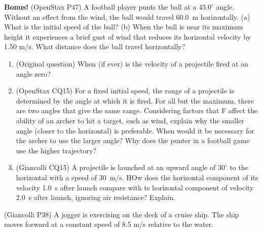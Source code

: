 \documentclass[10pt,twocolumn]{exam}
\def\myquestion{\question\stepcounter{footnote}}
\begin{document}
\begin{questions}
\myquestion \textbf{Bonus!} (OpenStax P47)
A football player punts the ball at a $45.0^\circ$ angle. Without an effect from the wind, the ball would travel 60.0~m horizontally. (a) What is the initial speed of the ball? (b) When the ball is near its maximum height it experiences a brief gust of wind that reduces its horizontal velocity by 1.50 m/s. What distance does the ball travel horizontally?


\begin{enumerate}[resume*]
  \item (Original question) When (if ever) is the velocity of a projectile fired at an angle zero?
  \item (OpenStax CQ15) For a fixed initial speed, the range of a projectile is determined by the angle at which it is fired. For all but the maximum, there are two angles that give the same range. Considering factors that F affect the ability of an archer to hit a target, such as wind, explain why the smaller angle (closer to the horizontal) is preferable. When would it be necessary for the archer to use the larger angle? Why does the punter in a football game use the higher trajectory?
  \item (Giancolli CQ15) A projectile is launched at an upward angle of $30^\circ$ to the horizontal with a speed of 30~m/s.  HOw does the horizontal component of its velocity 1.0~s after launch compare with ts horizontal component of velocity 2.0~s after launch, ignoring air resistance?  Explain.
\end{enumerate}




\myquestion (Giancolli P38) 
A jogger is exercising on the deck of a cruise ship. The ship moves forward at a constant speed of 8.5 m/s relative to the water.
\end{questions}
\end{document}
